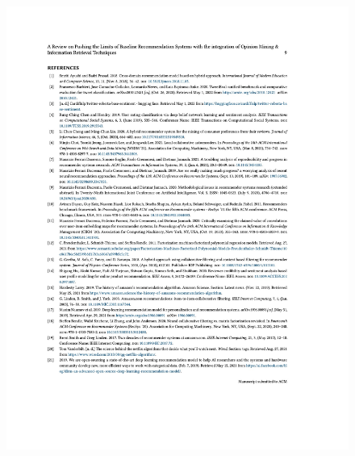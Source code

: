 \begin{figure}[h!]
\centering
\includegraphics[width=\textwidth]{images/appendix/papers/review/A Review on Pushing the Limits of Baseline Recommendation Systems with the integration of Opinion Mining & Information Retrieval Techniques 9.jpeg}
\end{figure}

